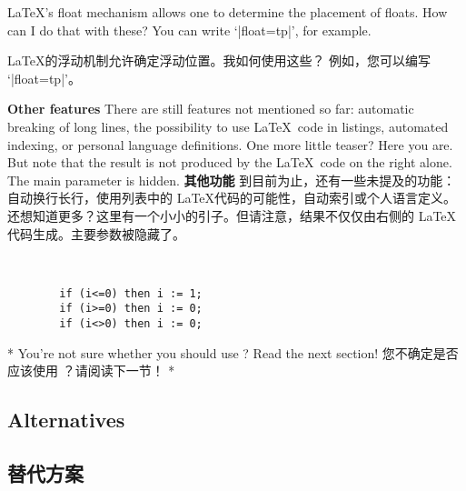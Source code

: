 \begin{advise}
\begin{paracol}{2}    
\item \LaTeX's float mechanism allows one to determine the placement of floats.
      How can I do that with these?
      \advisespace
      You can write `|float=tp|', for example.
\switchcolumn
\item \LaTeX 的浮动机制允许确定浮动位置。我如何使用这些？
\advisespace
例如，您可以编写 `|float=tp|'。
\end{paracol}
\end{advise}

\begin{paracol}{2}
\textbf{Other features}
There are still features not mentioned so far: automatic breaking of long
lines, the possibility to use \LaTeX\ code in listings, automated indexing,
or personal language definitions.
One more little teaser? Here you are. But note that the result is not
produced by the \LaTeX\ code on the right alone. The main parameter is
hidden.
\switchcolumn
\textbf{其他功能}
到目前为止，还有一些未提及的功能：自动换行长行，使用列表中的 \LaTeX 代码的可能性，自动索引或个人语言定义。
还想知道更多？这里有一个小小的引子。但请注意，结果不仅仅由右侧的 \LaTeX 代码生成。主要参数被隐藏了。

\begin{lstsample}{^^A
        }{}
        \begin{lstlisting}
        if (i<=0) then i := 1;
        if (i>=0) then i := 0;
        if (i<>0) then i := 0;
        \end{lstlisting}
\end{lstsample} 


\switchcolumn[0]*%
You're not sure whether you should use ?
Read the next section!
\switchcolumn
您不确定是否应该使用  ？请阅读下一节！
\switchcolumn[0]*%
\subsection{Alternatives}
\switchcolumn
\subsection{替代方案}
\end{paracol}

